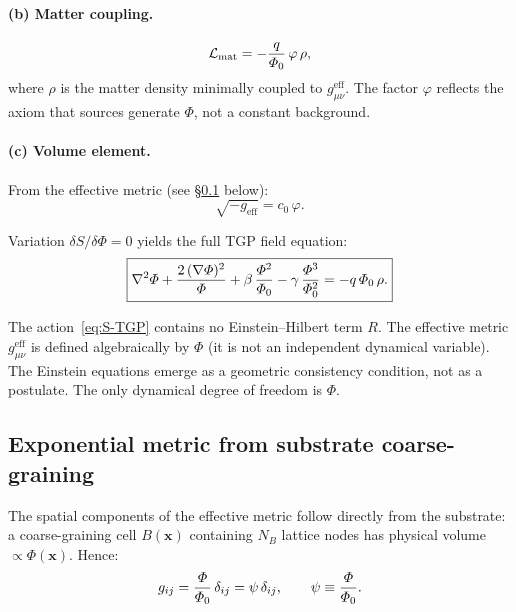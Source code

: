 \paragraph{(b) Matter coupling.}
\begin{equation}\label{eq:L-matter}
  \mathcal{L}_{\mathrm{mat}}
  = -\frac{q}{\varPhi_0}\,\varphi\,\rho,
\end{equation}
where $\rho$ is the matter density minimally coupled to
$g_{\mu\nu}^{\mathrm{eff}}$.
The factor $\varphi$ reflects the axiom that sources generate
$\Phi$, not a constant background.

\paragraph{(c) Volume element.}
From the effective metric (see \S\ref{ssec:exp-metric} below):
\begin{equation}\label{eq:sqrt-g}
  \sqrt{-g_{\mathrm{eff}}} = c_{0}\,\varphi.
\end{equation}

\noindent
Variation $\delta S/\delta\Phi = 0$ yields the full TGP field
equation:
\begin{equation}\label{eq:field-eq}
  \boxed{
    \nabla^{2}\varPhi
    + \frac{2\,(\nabla\varPhi)^{2}}{\varPhi}
    + \beta\,\frac{\varPhi^{2}}{\varPhi_0}
    - \gamma\,\frac{\varPhi^{3}}{\varPhi_0^{2}}
    = -q\,\varPhi_0\,\rho.
  }
\end{equation}

\begin{remark}\label{rem:not-ST}
The action~\eqref{eq:S-TGP} contains no Einstein--Hilbert term
$R$.  The effective metric $g_{\mu\nu}^{\mathrm{eff}}$ is defined
algebraically by $\Phi$ (it is not an independent dynamical
variable).  The Einstein equations emerge as a geometric
consistency condition, not as a postulate.
The only dynamical degree of freedom is $\Phi$.
\end{remark}

\subsection{Exponential metric from substrate coarse-graining}%
\label{ssec:exp-metric}

The spatial components of the effective metric follow directly
from the substrate: a coarse-graining cell $B(\mathbf{x})$
containing $N_{B}$ lattice nodes has physical volume
$\propto \Phi(\mathbf{x})$.  Hence:
\begin{equation}\label{eq:g-spatial}
  g_{ij} = \frac{\varPhi}{\varPhi_0}\,\delta_{ij} = \psi\,\delta_{ij},
  \qquad \psi \equiv \frac{\varPhi}{\varPhi_0}.
\end{equation}

